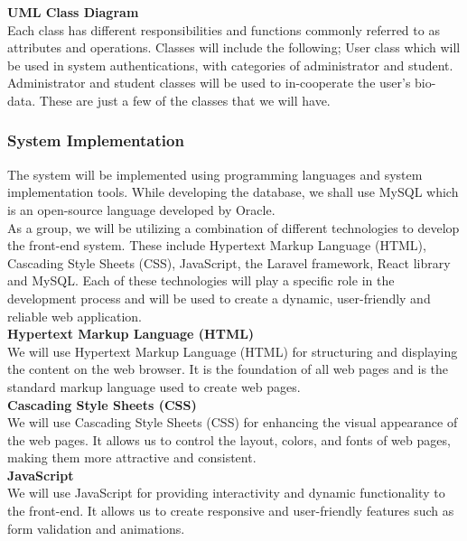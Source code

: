 \documentclass {article}
\begin{document}
\noindent \textbf{UML Class Diagram \\}
\noindent Each class has different responsibilities and functions commonly referred to as attributes and operations. Classes will include the following; User class which will be used in system authentications, with categories of administrator and student. Administrator and student classes will be used to in-cooperate the user’s bio-data. These are just a few of the classes that we will have.

\subsubsection{System Implementation}
\noindent The system will be implemented using programming languages and system implementation tools. While developing the database, we shall use MySQL which is an open-source language developed by Oracle.  \\

\noindent As a group, we will be utilizing a combination of different technologies to develop the front-end system. These include Hypertext Markup Language (HTML), Cascading Style Sheets (CSS), JavaScript, the Laravel framework, React library and MySQL. Each of these technologies will play a specific role in the development process and will be used to create a dynamic, user-friendly and reliable web application. \\

\noindent \textbf{Hypertext Markup Language (HTML)\\}
\noindent We will use Hypertext Markup Language (HTML) for structuring and displaying the content on the web browser. It is the foundation of all web pages and is the standard markup language used to create web pages.\\

\noindent \textbf{Cascading Style Sheets (CSS)\\}
\noindent We will use Cascading Style Sheets (CSS) for enhancing the visual appearance of the web pages. It allows us to control the layout, colors, and fonts of web pages, making them more attractive and consistent.\\

\noindent \textbf{JavaScript\\}
\noindent We will use JavaScript for providing interactivity and dynamic functionality to the front-end. It allows us to create responsive and user-friendly features such as form validation and animations.\\
\end{document}
